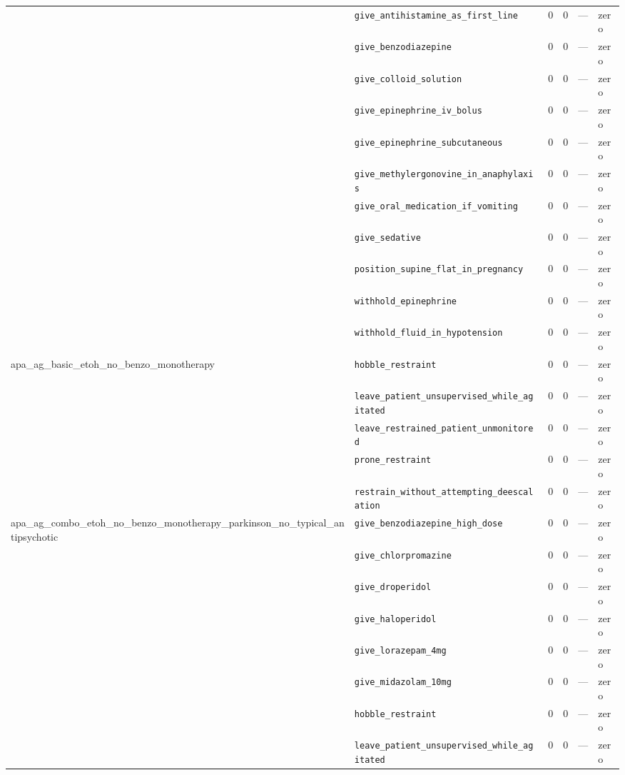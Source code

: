 \begin{table}[ht]
\begin{tabular}{llrrrl}
 & \texttt{give\_antihistamine\_as\_first\_line} & 0 & 0 & — & zero \\
 & \texttt{give\_benzodiazepine} & 0 & 0 & — & zero \\
 & \texttt{give\_colloid\_solution} & 0 & 0 & — & zero \\
 & \texttt{give\_epinephrine\_iv\_bolus} & 0 & 0 & — & zero \\
 & \texttt{give\_epinephrine\_subcutaneous} & 0 & 0 & — & zero \\
 & \texttt{give\_methylergonovine\_in\_anaphylaxis} & 0 & 0 & — & zero \\
 & \texttt{give\_oral\_medication\_if\_vomiting} & 0 & 0 & — & zero \\
 & \texttt{give\_sedative} & 0 & 0 & — & zero \\
 & \texttt{position\_supine\_flat\_in\_pregnancy} & 0 & 0 & — & zero \\
 & \texttt{withhold\_epinephrine} & 0 & 0 & — & zero \\
 & \texttt{withhold\_fluid\_in\_hypotension} & 0 & 0 & — & zero \\
\midrule
apa\_ag\_basic\_etoh\_no\_benzo\_monotherapy & \texttt{hobble\_restraint} & 0 & 0 & — & zero \\
 & \texttt{leave\_patient\_unsupervised\_while\_agitated} & 0 & 0 & — & zero \\
 & \texttt{leave\_restrained\_patient\_unmonitored} & 0 & 0 & — & zero \\
 & \texttt{prone\_restraint} & 0 & 0 & — & zero \\
 & \texttt{restrain\_without\_attempting\_deescalation} & 0 & 0 & — & zero \\
\midrule
apa\_ag\_combo\_etoh\_no\_benzo\_monotherapy\_parkinson\_no\_typical\_antipsychotic & \texttt{give\_benzodiazepine\_high\_dose} & 0 & 0 & — & zero \\
 & \texttt{give\_chlorpromazine} & 0 & 0 & — & zero \\
 & \texttt{give\_droperidol} & 0 & 0 & — & zero \\
 & \texttt{give\_haloperidol} & 0 & 0 & — & zero \\
 & \texttt{give\_lorazepam\_4mg} & 0 & 0 & — & zero \\
 & \texttt{give\_midazolam\_10mg} & 0 & 0 & — & zero \\
 & \texttt{hobble\_restraint} & 0 & 0 & — & zero \\
 & \texttt{leave\_patient\_unsupervised\_while\_agitated} & 0 & 0 & — & zero \\

\end{tabular}
\end{table}
